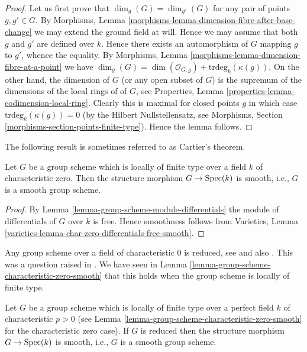 \begin{proof}
Let us first prove that $\dim_g(G) = \dim_{g'}(G)$ for any
pair of points $g, g' \in G$. By
Morphisms, Lemma \ref{morphisms-lemma-dimension-fibre-after-base-change}
we may extend the ground field at will. Hence we may assume that
both $g$ and $g'$ are defined over $k$. Hence there exists an
automorphism of $G$ mapping $g$ to $g'$, whence the equality.
By
Morphisms, Lemma \ref{morphisms-lemma-dimension-fibre-at-a-point}
we have
$\dim_g(G) = \dim(\mathcal{O}_{G, g}) +
\text{trdeg}_k(\kappa(g))$.
On the other hand, the dimension of $G$ (or any open subset of $G$)
is the supremum of the dimensions of the local rings of of $G$, see
Properties, Lemma \ref{properties-lemma-codimension-local-ring}.
Clearly this is maximal for closed points $g$ in which case
$\text{trdeg}_k(\kappa(g)) = 0$ (by the Hilbert Nullstellensatz, see
Morphisms, Section \ref{morphisms-section-points-finite-type}).
Hence the lemma follows.
\end{proof}

\noindent
The following result is sometimes referred to as Cartier's theorem.

\begin{lemma}
\label{lemma-group-scheme-characteristic-zero-smooth}
Let $G$ be a group scheme which is locally of finite type
over a field $k$ of characteristic zero. Then the structure
morphism $G \to \mathop{\rm Spec}(k)$ is smooth, i.e., $G$ is a smooth
group scheme.
\end{lemma}

\begin{proof}
By
Lemma \ref{lemma-group-scheme-module-differentials}
the module of differentials of $G$ over $k$ is free.
Hence smoothness follows from
Varieties, Lemma \ref{varieties-lemma-char-zero-differentials-free-smooth}.
\end{proof}

\begin{remark}
\label{remark-when-reduced}
Any group scheme over a field of characteristic $0$ is reduced, see
\cite[I, Theorem 1.1 and I, Corollary 3.9, and II, Theorem 2.4]{Perrin-thesis}
and also
\cite[Proposition 4.2.8]{Perrin}.
This was a question raised in
\cite[page 80]{Oort}.
We have seen in
Lemma \ref{lemma-group-scheme-characteristic-zero-smooth}
that this holds when the group scheme is locally of finite type.
\end{remark}

\begin{lemma}
\label{lemma-reduced-group-scheme-prefect-field-characteristic-p-smooth}
Let $G$ be a group scheme which is locally of finite type
over a perfect field $k$ of characteristic $p > 0$ (see
Lemma \ref{lemma-group-scheme-characteristic-zero-smooth}
for the characteristic zero case). If $G$ is reduced then the structure
morphism $G \to \mathop{\rm Spec}(k)$ is smooth, i.e., $G$ is a smooth
group scheme.
\end{lemma}

